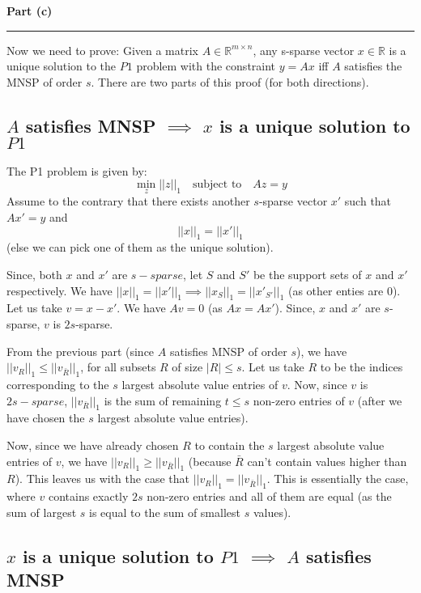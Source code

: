 \documentclass[a4paper,12pt]{article}
\newenvironment{solution}[2][]{%
    \begin{mdframed}[linecolor=blue!70!black, linewidth=2pt, roundcorner=10pt, backgroundcolor=yellow!10!white, skipabove=12pt, skipbelow=12pt]%
        \textbf{\large #2}
        \par\noindent\rule{\textwidth}{0.4pt}
}{
    \end{mdframed}
}
\begin{document}
\begin{solution}{Part (c)}
  Now we need to prove:
  Given a matrix $A \in \mathbb{R}^{m\times n}$, any s-sparse vector $x \in \mathbb{R}$ is a unique solution to the $P1$ problem with the constraint $y = Ax$ iff $A$ satisfies the MNSP of order $s$. There are two parts of this proof (for both directions).

  \subsection*{$A$ satisfies MNSP $\implies$ $x$ is a unique solution to $P1$}
  The P1 problem is given by:
  \[
    \min_{z}||z||_1 \quad \text{subject to} \quad Az = y
  \]
  Assume to the contrary that there exists another $s$-sparse vector $x'$ such that $Ax' = y$ and $$||x||_1 = ||x'||_1$$ (else we can pick one of them as the unique solution). 

  Since, both $x$ and $x'$ are $s-sparse$, let $S$ and $S'$ be the support sets of $x$ and $x'$ respectively. We have $||x||_1 = ||x'||_1 \implies ||x_S||_1 = ||x'_{S'}||_1$ (as other enties are 0). Let us take $v = x - x'$. We have $Av = 0$ (as $Ax = Ax'$). Since, $x$ and $x'$ are $s$-sparse, $v$ is $2s$-sparse. 

  From the previous part (since $A$ satisfies MNSP of order $s$), we have $||v_R||_1 \leq ||v_{\bar{R}}||_1$, for all subsets $R$ of size $|R| \leq s$. Let us take $R$ to be the indices corresponding to the $s$ largest absolute value entries of $v$. Now, since $v$ is $2s-sparse$, $||v_{\bar{R}}||_1$ is the sum of remaining $t \leq s$ non-zero entries of $v$ (after we have chosen the $s$ largest absolute value entries).
  
  Now, since we have already chosen $R$ to contain the $s$ largest absolute value entries of $v$, we have $||v_R||_1 \geq ||v_{\bar{R}}||_1$ (because $\bar{R}$ can't contain values higher than $R$). This leaves us with the case that $||v_R||_1 = ||v_{\bar{R}}||_1$. This is essentially the case, where $v$ contains exactly $2s$ non-zero entries and all of them are equal (as the sum of largest $s$ is equal to the sum of smallest $s$ values). 

  \subsection*{$x$ is a unique solution to $P1$ $\implies$ $A$ satisfies MNSP}
  
\end{solution}
\end{document}
